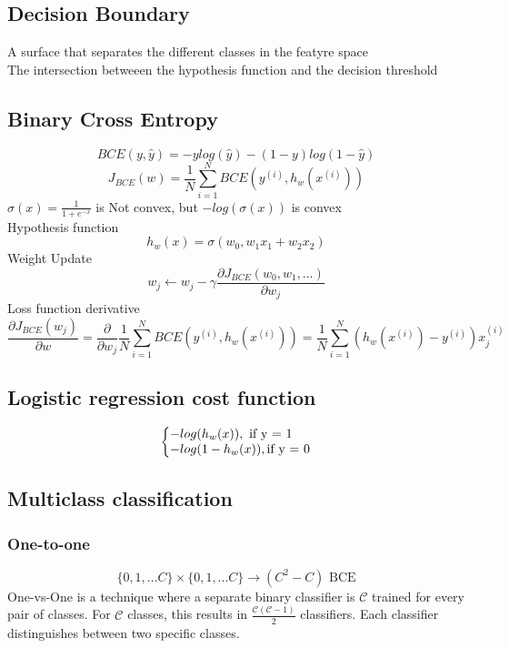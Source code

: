 \documentclass{article}
\makeatletter
\newenvironment{system}%
{\left\lbrace\begin{array}{@{}l@{}}}%
{\end{array}\right.}
\makeatother
\begin{document}
\subsection*{Decision Boundary}
A surface that separates the different classes in the featyre space \\
The intersection betweeen the hypothesis function and the decision threshold \\

\subsection*{Binary Cross Entropy}
\[BCE(y, \hat{y}) = -ylog(\hat{y}) - (1 - y)log(1 - \hat{y})\]
\[J_{BCE}(w) = \frac{1}{N} \sum_{i=1}^{N} BCE(y^{(i)}, h_w(x^{(i)}))\]
$\sigma(x) = \frac{1}{1 + e^{-x}}$ is Not convex, but
$-log(\sigma(x))$ is convex\\
Hypothesis function
\[h_w(x) = \sigma(w_0, w_1 x_1 + w_2 x_2) \]
Weight Update
\[w_j \leftarrow w_j - \gamma \frac{\partial J_{BCE}(w_0, w_1, \dots)}{\partial w_j}\]
Loss function derivative
\[\frac{\partial J_{BCE}(w_j)}{\partial w} = \frac{\partial}{\partial w_j} \frac{1}{N} \sum_{i=1}^{N} BCE(y^{(i)}, h_w(x^{(i)})) = \frac{1}{N} \sum_{i=1}^{N} (h_w(x^{(i)}) - y^{(i)})x_j^{(i)}\]
\subsection{Logistic regression cost function}
\begin{equation}
    \begin{system}
    -log(h_w(x)), \text{ if y = 1}\\
    -log(1 - h_w(x)), \text{if y = 0}
    \end{system}
\end{equation}


\subsection*{Multiclass classification}
\subsubsection*{One-to-one}
\[\{0, 1, ... C\} \times \{0, 1, ... C\} \rightarrow (C^2 - C) \text{ BCE}\]
One-vs-One is a technique where a separate binary classifier is $\mathcal{C}$ trained for every pair of classes. For $\mathcal{C}$ classes, this results in $\frac{\mathcal{C}(\mathcal{C} - 1)}{2}$ classifiers. Each classifier distinguishes between two specific classes.
\end{document}
